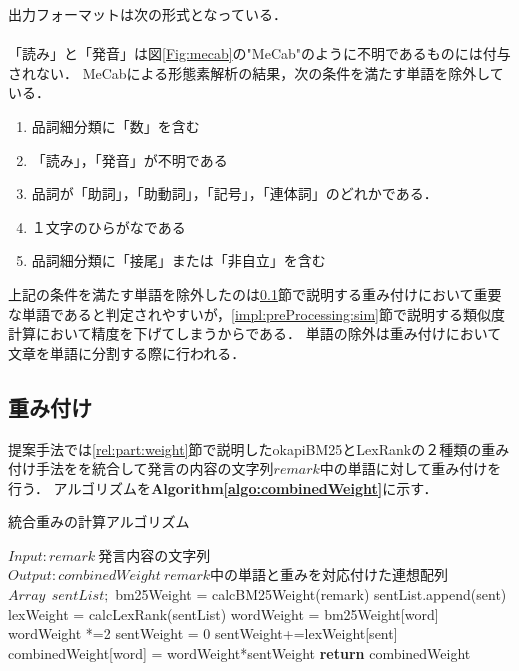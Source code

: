 出力フォーマットは次の形式となっている．\\
\\
「読み」と「発音」は図\ref{Fig:mecab}の"MeCab"のように不明であるものには付与されない．
MeCabによる形態素解析の結果，次の条件を満たす単語を除外している．
\begin{enumerate}
  \item 品詞細分類に「数」を含む
  \item 「読み」，「発音」が不明である
  \item 品詞が「助詞」，「助動詞」，「記号」，「連体詞」のどれかである． 
  \item １文字のひらがなである
  \item 品詞細分類に「接尾」または「非自立」を含む
\end{enumerate}
上記の条件を満たす単語を除外したのは\ref{impl:preProcessing:weight}節で説明する重み付けにおいて重要な単語であると判定されやすいが，\ref{impl:preProcessing:sim}節で説明する類似度計算において精度を下げてしまうからである．
単語の除外は重み付けにおいて文章を単語に分割する際に行われる．

\subsection{重み付け}
\label{impl:preProcessing:weight}
提案手法では\ref{rel:part:weight}節で説明したokapiBM25とLexRankの２種類の重み付け手法をを統合して発言の内容の文字列$remark$中の単語に対して重み付けを行う．
アルゴリズムを\textbf{Algorithm\ref{algo:combinedWeight}}に示す．
\begin{algorithm}
\caption{統合重みの計算アルゴリズム} \label{algo:combinedWeight}
\begin{algorithmic}[1]
\State $Input: remark  ~ 発言内容の文字列$
\State $Output:  combinedWeight ~ remark中の単語と重みを対応付けた連想配列$
\State $Array ~~ sentList;$ 
	\State bm25Weight = calcBM25Weight(remark)\label{algo:combinedWight:bm25}
		\State sentList.append(sent)
	\EndFor
	\State lexWeight = calcLexRank(sentList)
	 \label{algo:combinedWight:for1-b}
	 	\State wordWeight = bm25Weight[word]
			\State wordWeight *=2\label{algo:combinedWight:pNoun}
		\EndIf
		\State sentWeight = 0
		\label{algo:combinedWight:for2-b}
				\State sentWeight+=lexWeight[sent]
			\EndIf
		\EndFor\label{algo:combinedWight:for2-e}
		\State combinedWeight[word] = wordWeight*sentWeight \label{algo:combinedWight:final}
	 \EndFor\label{algo:combinedWeight:for1-e}
	\State \textbf{return} combinedWeight
\EndProcedure
\end{algorithmic}
\end{algorithm}

